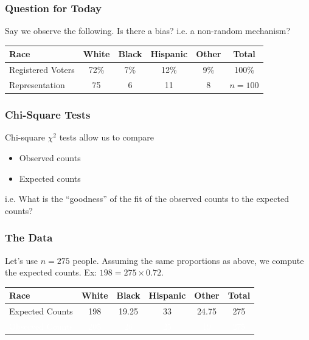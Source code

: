 \documentclass[slides]{beamer}
\newcommand{\blue}[1]{\textcolor{blue2}{#1}}
\newcommand{\white}[1]{\textcolor{white}{#1}}
\begin{document}
\begin{frame}[fragile]
\frametitle{Question for Today}

Say we observe the following.  Is there a bias?  i.e. a non-random mechanism?

\begin{center}
\begin{tabular}{l||cccc|c}
Race & White & Black & Hispanic & Other & Total \\ 
\hline
Registered Voters & 72\% & 7\% & 12\% & 9\% & 100\%\\ 
Representation & 75 & 6 & 11 & 8 & $n=100$ \\ 
\end{tabular}
\end{center}

\end{frame}


\begin{frame}[fragile]
\frametitle{Chi-Square Tests}

\blue{Chi-square $\chi^2$ tests} allow us to compare
\begin{itemize}
\item Observed counts
\item Expected counts
\end{itemize}

\vspace{0.5cm}

\pause i.e. What is the \blue{``goodness''} of the fit of the observed counts to the expected counts?

\end{frame}


\begin{frame}[fragile]
\frametitle{The Data}

Let's use $n=275$ people.  Assuming the same proportions as above,  we compute the \blue{expected} counts.  Ex: $198 = 275 \times 0.72$. 

\begin{center}
\begin{tabular}{l||cccc|c}
Race & White & Black & Hispanic & Other & Total \\ 
\hline
Expected Counts & 198 & 19.25 & 33 & 24.75 & 275\\ 
\white{Observed Counts} & \white{205} & \white{26} & \white{25} & \white{19} & \white{275}\\ 
\end{tabular}
\end{center}

\end{frame}
\end{document}
